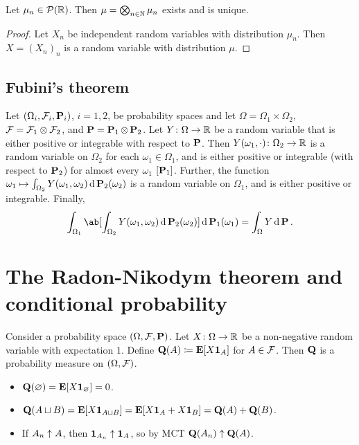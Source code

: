 \documentclass[12pt]{article}
\begin{document}
\begin{theorem}
    Let $\mu_n \in \mcP(\R)$.
    Then $\mu = \bigotimes_{n \in \N} \mu_n$ exists and is unique.
\end{theorem}
\begin{proof}
    Let $X_n$ be independent random variables with distribution $\mu_n$.
    Then $X = (X_n)_n$ is a random variable with distribution $\mu$.
\end{proof}

\subsection{Fubini's theorem} \label{sec:fubini}
\begin{theorem*} \label{thm:fubini}
    Let $(\Omega_i, \mcF_i, \P_i)$, $i = 1, 2$, be probability spaces and
    let $\Omega = \Omega_1 \times \Omega_2$, $\mcF = \mcF_1 \otimes \mcF_2$,
    and $\P = \P_1 \otimes \P_2$.
    Let $Y\colon \Omega \to \R$ be a random variable that is either positive
    or integrable with respect to $\P$.
    Then $Y(\omega_1, \cdot)\colon \Omega_2 \to \R$ is a random variable on
    $\Omega_2$ for each $\omega_1 \in \Omega_1$, and is either positive or
    integrable (with respect to $\P_2$) for almost every $\omega_1$
    $[\P_1]$.
    Further, the function
    $\omega_1 \mapsto \int_{\Omega_2} Y(\omega_1, \omega_2) \dd \P_2(\omega_2)$
    is a random variable on $\Omega_1$, and is either positive or integrable.
    Finally, \[
        \int_{\Omega_1} \ab[\int_{\Omega_2} Y(\omega_1, \omega_2) \dd \P_2(\omega_2)]
                                    \dd \P_1(\omega_1)
            = \int_\Omega Y \dd \P.
    \]
\end{theorem*}

\section{The Radon-Nikodym theorem and conditional probability} \label{sec:radon}
Consider a probability space $(\Omega, \mcF, \P)$.
Let $X\colon \Omega \to \R$ be a non-negative random variable with
expectation $1$.
Define $\Qr(A) \coloneq \E[X\1A]$ for $A \in \mcF$.
Then $\Qr$ is a probability measure on $(\Omega, \mcF)$.
\begin{itemize}
    \item $\Qr(\O) = \E[X\1\O] = 0$.
    \item $\Qr(A \sqcup B) = \E[X\1{A \sqcup B}] = \E[X\1A + X\1B]
        = \Qr(A) + \Qr(B)$.
    \item If $A_n \upto A$, then $\1{A_n} \upto \1A$, so by MCT
        $\Qr(A_n) \upto \Qr(A)$.
\end{itemize}
\end{document}
